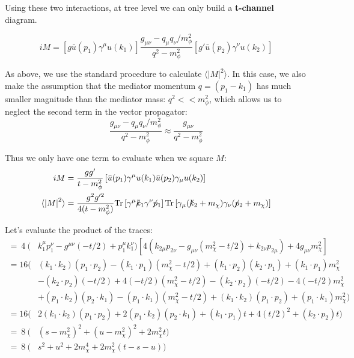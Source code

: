 \documentclass[11pt, oneside]{article}   	%
\newcommand{\fsl}[1]{\ensuremath{\mathrlap{\!\not{\phantom{#1}}}#1}}%
\begin{document}
Using these two interactions, at tree level we can only build a \textbf{t-channel} diagram.

\[ iM = \left[ g \bar{u}(p_1) \gamma^\mu u(k_1) \right] \frac{g_{\mu\nu} - q_\mu q_\nu / m_\phi^2}{q^2 - m_\phi^2} \left[ g' \bar{u}(p_2) \gamma^\nu u(k_2) \right] \]

As above, we use the standard procedure to calculate $\langle \left| M \right|^2 \rangle$. 
In this case, we also make the assumption that the mediator momentum $q = (p_1 - k_1)$ has much smaller magnitude than the mediator mass: $q^2 << m_\phi^2$, which allows us to neglect the second term in the vector propagator: \[ \frac{g_{\mu\nu} - q_\mu q_\nu / m_\phi^2}{q^2 - m_\phi^2} \approx \frac{g_{\mu\nu}}{q^2 - m_\phi^2} \]

Thus we only have one term to evaluate when we square $M$: 
\begin{align*}
iM & = \frac{gg'}{t-m_\phi^2} \left[ \bar{u}(p_1)\gamma^\mu u(k_1) \bar{u}(p_2) \gamma_\mu u(k_2) \right] \\
\langle \left| M \right|^2 \rangle & = \frac{g^2g'^2}{4(t-m_\phi^2)} \text{Tr} \left[ \gamma^\mu \fsl{k_1} \gamma^\nu \fsl{p_1} \right] \text{Tr} \left[ \gamma_\mu (\fsl{k_2} + m_\chi) \gamma_\nu (\fsl{p_2} + m_\chi) \right] 
\end{align*}

Let's evaluate the product of the traces:
\scriptsize
\begin{align*}
    = ~ 4 ~ (& k_1^\mu p_1^\nu - g^{\mu\nu} (-t/2) + p_1^\mu k_1^\nu) \left[ 4(k_{2\mu} p_{2\nu} - g_{\mu\nu} (m_\chi^2 - t/2) + k_{2\nu}p_{2\mu}) + 4g_{\mu\nu} m_\chi^2 \right] \\
    = 16 \Big( & (k_1\cdot k_2)(p_1 \cdot p_2) - (k_1 \cdot p_1)(m_\chi^2 - t/2) + (k_1 \cdot p_2)(k_2 \cdot p_1) + (k_1 \cdot p_1)m_\chi^2 \\
    & - (k_2 \cdot p_2) (-t/2) + 4(-t/2)(m_\chi^2 - t/2) - (k_2 \cdot p_2)(-t/2) - 4(-t/2) m_\chi^2 \\
    & + (p_1 \cdot k_2)(p_2 \cdot k_1) - (p_1 \cdot k_1)(m_\chi^2 - t/2) + (k_1 \cdot k_2)(p_1 \cdot p_2) + (p_1 \cdot k_1)m_\chi^2 \Big) \\
    = 16 \Big( & 2(k_1 \cdot k_2) (p_1 \cdot p_2) + 2 (p_1 \cdot k_2) (p_2 \cdot k_1) + (k_1 \cdot p_1) t + 4(t/2)^2 + (k_2 \cdot p_2)t \Big) \\
    = ~ 8 ~ \Big( & (s-m_\chi^2)^2 + (u - m_\chi^2)^2 + 2m_\chi^2 t \Big) \\
    = ~ 8 ~ \Big( & s^2 + u^2 + 2m_\chi^4 + 2m_\chi^2 (t-s-u) \Big)
\end{align*}
\normalsize
\end{document}
